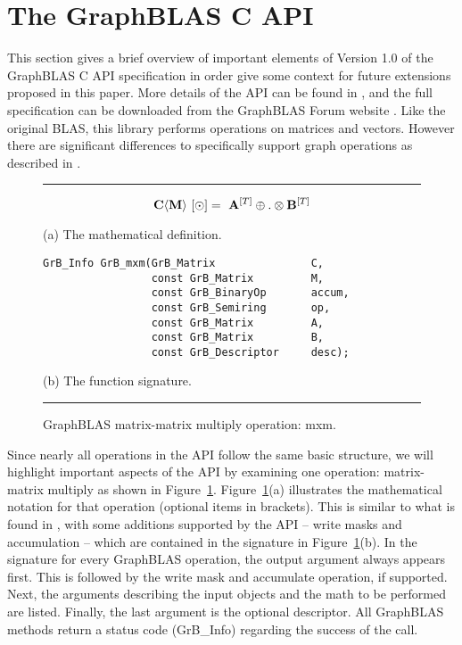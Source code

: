 %
%

\renewcommand{\vector}[1]{{\bf #1}}
\renewcommand{\matrix}[1]{{\bf #1}}

\section{The GraphBLAS C API}
\label{sec:GrBCspec}

This section gives a brief overview of important elements 
of Version 1.0 of the GraphBLAS C API specification in order give some context 
for future extensions proposed in this paper.  More details of the API can be 
found in \cite{graphblas_capi_17}, and the full specification can be downloaded 
from the GraphBLAS Forum website \cite{graphblas_web}.  Like the original BLAS, 
this library performs operations on matrices and vectors.  However there are 
significant differences to specifically support graph operations as described 
in \cite{mathgraphblas16}. 

\begin{figure}[b]
\hrule
\footnotesize
\[
\matrix{C}\langle \matrix{M} \rangle ~ [\odot] = ~ \matrix{A}^{[T]} \oplus.\otimes \matrix{B}^{[T]}
\]
\begin{center}(a) The mathematical definition.\end{center}

\begin{verbatim}
GrB_Info GrB_mxm(GrB_Matrix               C,
                 const GrB_Matrix         M,  
                 const GrB_BinaryOp       accum,
                 const GrB_Semiring       op,
                 const GrB_Matrix         A, 
                 const GrB_Matrix         B,
                 const GrB_Descriptor     desc);
\end{verbatim}
\begin{center}(b) The function signature.\end{center}
\caption{GraphBLAS matrix-matrix multiply operation: {\sf mxm}.\label{Fig:mxmfig}}
\hrule
\end{figure}

Since nearly all operations in the API follow the same basic structure, we will
highlight important aspects of the API by examining one operation: matrix-matrix
multiply as shown in Figure~\ref{Fig:mxmfig}.  Figure~\ref{Fig:mxmfig}(a) illustrates
the mathematical notation for that operation (optional items in brackets). This is similar to what is found in
\cite{mathgraphblas16}, with some additions supported by the API -- write masks and
accumulation -- which are contained in the signature in Figure~\ref{Fig:mxmfig}(b).
In the signature for every GraphBLAS operation, the output argument always 
appears first. This is followed by the write mask and accumulate operation, if supported. 
Next, the arguments describing the input objects and the math to be performed are
listed. Finally, the last argument is the optional descriptor.  All GraphBLAS methods
return a status code ({\sf GrB\_Info}) regarding the success of the call.


